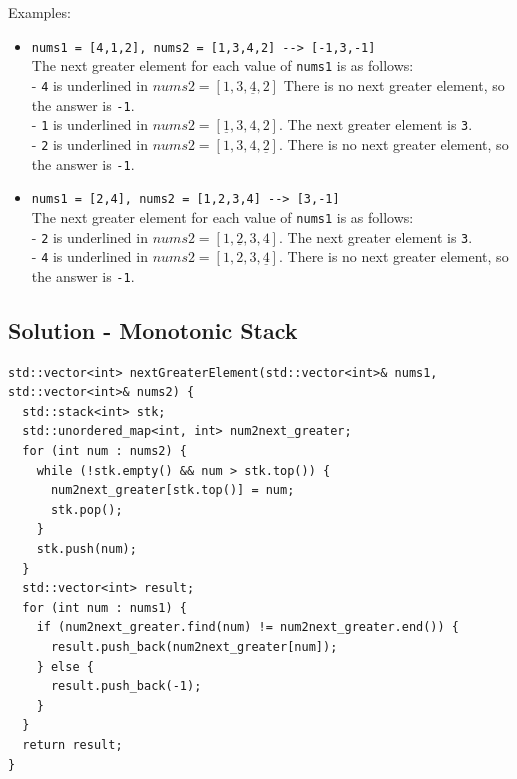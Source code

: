 Examples:
\begin{itemize}
\item {\colorbox{CodeBackground}{\lstinline|nums1 = [4,1,2], nums2 = [1,3,4,2] --> [-1,3,-1]|}}\\
The next greater element for each value of {\colorbox{CodeBackground}{\lstinline|nums1|}} is as follows:\\
- {\colorbox{CodeBackground}{\lstinline|4|}} is underlined in $nums2 = [1,3,\underline{4},2]$ There is no next greater element, so the answer is {\colorbox{CodeBackground}{\lstinline|-1|}}.\\
- {\colorbox{CodeBackground}{\lstinline|1|}} is underlined in $nums2 = [\underline{1},3,4,2]$. The next greater element is {\colorbox{CodeBackground}{\lstinline|3|}}.\\
- {\colorbox{CodeBackground}{\lstinline|2|}} is underlined in $nums2 = [1,3,4,\underline{2}]$. There is no next greater element, so the answer is {\colorbox{CodeBackground}{\lstinline|-1|}}.
\item {\colorbox{CodeBackground}{\lstinline|nums1 = [2,4], nums2 = [1,2,3,4] --> [3,-1]|}}\\
The next greater element for each value of {\colorbox{CodeBackground}{\lstinline|nums1|}} is as follows:\\
- {\colorbox{CodeBackground}{\lstinline|2|}} is underlined in $nums2 = [1,\underline{2},3,4]$. The next greater element is {\colorbox{CodeBackground}{\lstinline|3|}}.\\
- {\colorbox{CodeBackground}{\lstinline|4|}} is underlined in $nums2 = [1,2,3,\underline{4}]$. There is no next greater element, so the answer is {\colorbox{CodeBackground}{\lstinline|-1|}}.
\end{itemize}

\subsection*{Solution - Monotonic Stack}
\begin{lstlisting}
std::vector<int> nextGreaterElement(std::vector<int>& nums1, std::vector<int>& nums2) {
  std::stack<int> stk;
  std::unordered_map<int, int> num2next_greater;
  for (int num : nums2) {
    while (!stk.empty() && num > stk.top()) {
      num2next_greater[stk.top()] = num;
      stk.pop();
    }
    stk.push(num);
  }
  std::vector<int> result;
  for (int num : nums1) {
    if (num2next_greater.find(num) != num2next_greater.end()) {
      result.push_back(num2next_greater[num]);
    } else {
      result.push_back(-1);
    }
  }
  return result;
}
\end{lstlisting}

